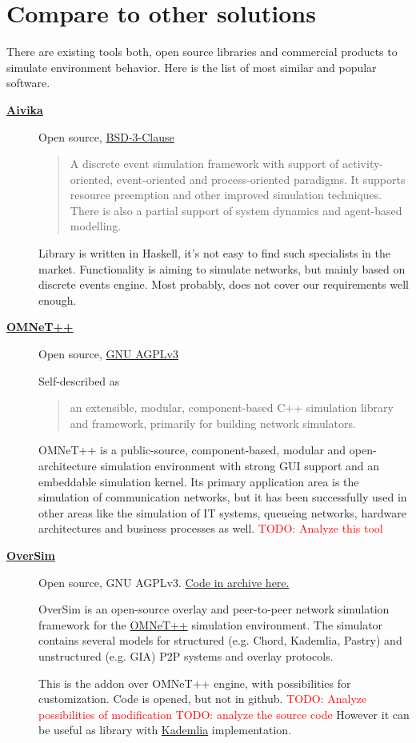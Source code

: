 \documentclass[12pt,oneside]{article}
\newcommand{\todo}[1]{\textcolor{red}{TODO: #1}}
\begin{document}
\section{Compare to other solutions}

There are existing tools both, open source libraries and commercial products to simulate environment behavior. Here is the list of most similar and popular software.\par
\begin{description}
  \item[\href{https://github.com/dsorokin/aivika}{\textbf{Aivika}}]
Open source, \href{https://hackage.haskell.org/package/aivika-5.9/src/LICENSE}{BSD-3-Clause}
    \begin{quote}
A discrete event simulation framework with support of activity-oriented, event-oriented and process-oriented paradigms. It supports resource preemption and other improved simulation techniques. There is also a partial support of system dynamics and agent-based modelling.
    \end{quote}
Library is written in Haskell, it's not easy to find such specialists in the market. Functionality is aiming to simulate networks, but mainly based on discrete events engine. Most probably, does not cover our requirements well enough.

  \item[\href{https://omnetpp.org/}{\textbf{OMNeT++}}]
Open source, \href{https://github.com/omnetpp/omnetpp}{GNU AGPLv3}\par
Self-described as 
    \begin{quote}
        an extensible, modular, component-based C++ simulation library and framework, primarily for building network simulators.
    \end{quote}
OMNeT++ is a public-source, component-based, modular and open-architecture simulation environment with strong GUI support and an embeddable simulation kernel. Its primary application area is the simulation of communication networks, but it has been successfully used in other areas like the simulation of IT systems, queueing networks, hardware architectures and business processes as well.
\todo{Analyze this tool}

  \item[\href{http://www.oversim.org/wiki}{\textbf{OverSim}}]
Open source, GNU AGPLv3. \href{http://www.oversim.org/wiki/OverSimDownload}{Code in archive here.}

OverSim is an open-source overlay and peer-to-peer network simulation framework for the \href{https://omnetpp.org/}{OMNeT++} simulation environment. The simulator contains several models for structured (e.g. Chord, Kademlia, Pastry) and unstructured (e.g. GIA) P2P systems and overlay protocols.\par
This is the addon over OMNeT++ engine, with possibilities for customization. Code is opened, but not in github. \todo{Analyze possibilities of modification}
\todo{analyze the source code}
However it can be useful as library with \href{https://en.wikipedia.org/wiki/Kademlia}{Kademlia} implementation.


\end{description}
\end{document}
